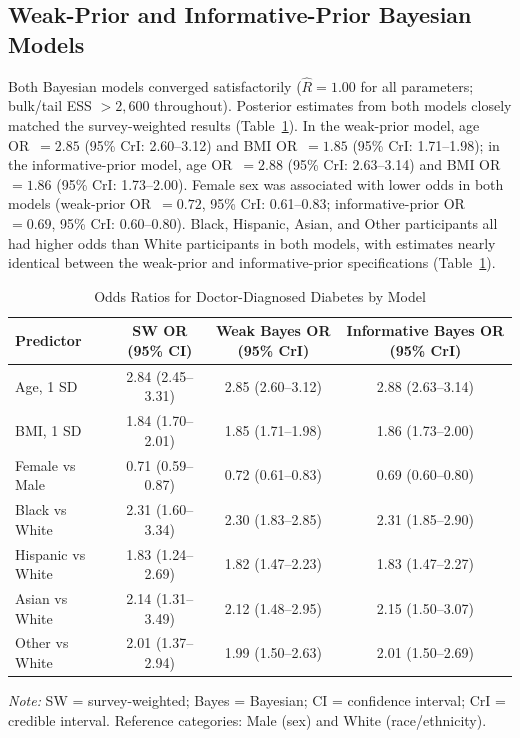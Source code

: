 \documentclass[11pt]{article}
\begin{document}
\subsection{Weak-Prior and Informative-Prior Bayesian Models}
Both Bayesian models converged satisfactorily ($\hat{R}=1.00$ for all
parameters; bulk/tail ESS $>2{,}600$ throughout). Posterior estimates from
both models closely matched the survey-weighted results
(Table~\ref{tab:or_comparison}). In the weak-prior model, age OR~$=2.85$
(95\% CrI: 2.60--3.12) and BMI OR~$=1.85$ (95\% CrI: 1.71--1.98); in the
informative-prior model, age OR~$=2.88$ (95\% CrI: 2.63--3.14) and BMI
OR~$=1.86$ (95\% CrI: 1.73--2.00). Female sex was associated with lower
odds in both models (weak-prior OR~$=0.72$, 95\% CrI: 0.61--0.83;
informative-prior OR~$=0.69$, 95\% CrI: 0.60--0.80). Black, Hispanic, Asian,
and Other participants all had higher odds than White participants in both
models, with estimates nearly identical between the weak-prior and
informative-prior specifications (Table~\ref{tab:or_comparison}).
\begin{table}[H]
\centering
\small
\setlength{\tabcolsep}{4pt}

\caption{Odds Ratios for Doctor-Diagnosed Diabetes by Model}
\label{tab:or_comparison}

\begin{tabular}{lccc}
\toprule
\textbf{Predictor} &
\textbf{SW OR (95\% CI)} &
\textbf{Weak Bayes OR (95\% CrI)} &
\textbf{Informative Bayes OR (95\% CrI)} \\
\midrule

Age, 1 SD
& 2.84 (2.45--3.31)
& 2.85 (2.60--3.12)
& 2.88 (2.63--3.14) \\

BMI, 1 SD
& 1.84 (1.70--2.01)
& 1.85 (1.71--1.98)
& 1.86 (1.73--2.00) \\

Female vs Male
& 0.71 (0.59--0.87)
& 0.72 (0.61--0.83)
& 0.69 (0.60--0.80) \\

Black vs White
& 2.31 (1.60--3.34)
& 2.30 (1.83--2.85)
& 2.31 (1.85--2.90) \\

Hispanic vs White
& 1.83 (1.24--2.69)
& 1.82 (1.47--2.23)
& 1.83 (1.47--2.27) \\

Asian vs White
& 2.14 (1.31--3.49)
& 2.12 (1.48--2.95)
& 2.15 (1.50--3.07) \\

Other vs White
& 2.01 (1.37--2.94)
& 1.99 (1.50--2.63)
& 2.01 (1.50--2.69) \\

\bottomrule
\end{tabular}

\begin{flushleft}
\footnotesize
\textit{Note:} SW = survey-weighted; Bayes = Bayesian;
CI = confidence interval; CrI = credible interval.
Reference categories: Male (sex) and White (race/ethnicity).
\end{flushleft}

\end{table}
\end{document}
